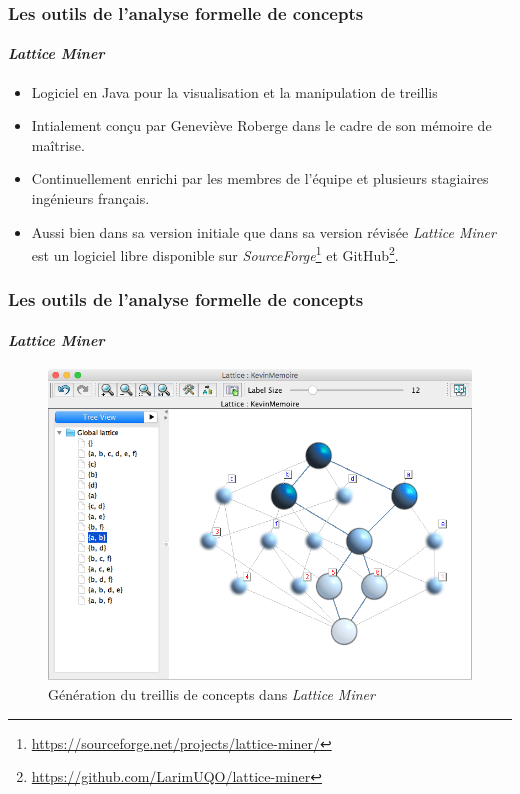 \documentclass[french]{beamer}
\newcommand{\lm}{\emph{Lattice Miner}\xspace}
\begin{document}
\begin{frame}
\frametitle{Les outils de l'analyse formelle de concepts}
\framesubtitle{\lm}
\begin{itemize}
\item Logiciel en Java pour la visualisation et la manipulation de treillis
\item Intialement conçu par Geneviève Roberge dans le cadre de son mémoire de maîtrise.
\item Continuellement enrichi par les membres de l'équipe et plusieurs stagiaires ingénieurs français.
\item Aussi bien dans sa version initiale que dans sa version révisée \lm est un logiciel libre disponible sur \emph{SourceForge}\footnote{\url{https://sourceforge.net/projects/lattice-miner/}} et GitHub\footnote{\url{https://github.com/LarimUQO/lattice-miner}}.
\end{itemize}
\end{frame}
\begin{frame}
\frametitle{Les outils de l'analyse formelle de concepts}
\framesubtitle{\lm}
\begin{figure}[H]
\caption{Génération du treillis de concepts dans \lm}
\label{cap:fig:lm-treillis}
\begin{center}\includegraphics[scale=0.32]{figures/lm-treillis.jpg}\end{center}
\end{figure}
\end{frame}
\end{document}
